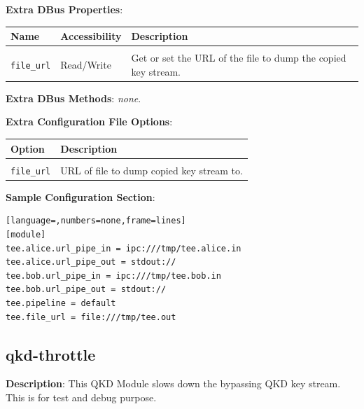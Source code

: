 \bigskip

\noindent \textbf{Extra DBus Properties}:

\medskip

\begin{tabular}{llp{7cm}}

Name                    & Accessibility &   Description \\
\hline
\\
\texttt{file\_url}      & Read/Write    &   Get or set the URL of the file to dump the copied key stream. \\ [0.5em]

\end{tabular}

\bigskip

\noindent \textbf{Extra DBus Methods}: \emph{none}.

\bigskip

\noindent \textbf{Extra Configuration File Options}:

\medskip

\begin{tabular}{lp{9cm}}

Option                      & Description \\
\hline
\\
\texttt{file\_url}          & URL of file to dump copied key stream to. \\ [0.5em]

\end{tabular}

\bigskip

\noindent \textbf{Sample Configuration Section}: 

\medskip

\begin{lstlisting}[language=,numbers=none,frame=lines]
[module]
tee.alice.url_pipe_in = ipc:///tmp/tee.alice.in
tee.alice.url_pipe_out = stdout://
tee.bob.url_pipe_in = ipc:///tmp/tee.bob.in
tee.bob.url_pipe_out = stdout://
tee.pipeline = default
tee.file_url = file:///tmp/tee.out
\end{lstlisting}

\clearpage


\subsection{qkd-throttle}
\label{subsec:qkd-throttle}

\textbf{Description}: This QKD Module slows down the bypassing QKD key stream. This is for test and debug purpose.

